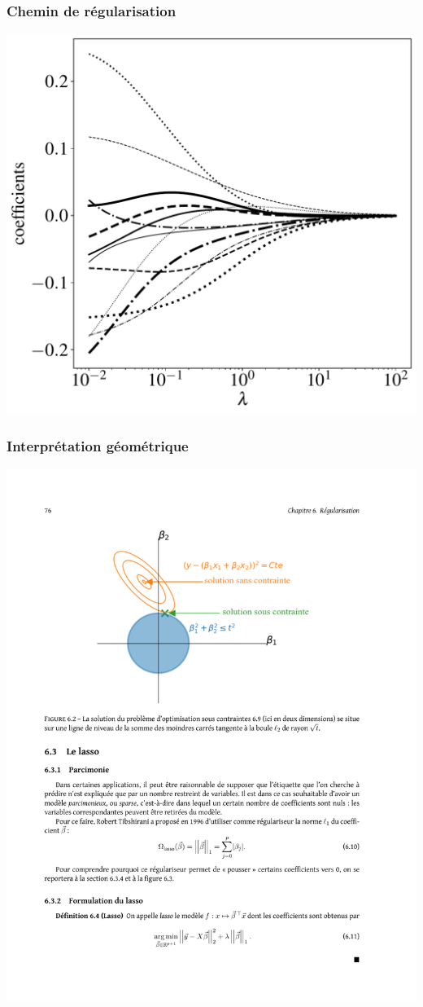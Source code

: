\begin{frame}
  \frametitle{Chemin de régularisation}
  \begin{center}
    \includegraphics[width=.7\textwidth]{figures/ridge_path}  
  \end{center}
\end{frame}

\begin{frame}
  \frametitle{Interprétation géométrique}
  \begin{center}
    \includegraphics[width=.7\textwidth]{figures/l2reg_geom}  
  \end{center}
\end{frame}


